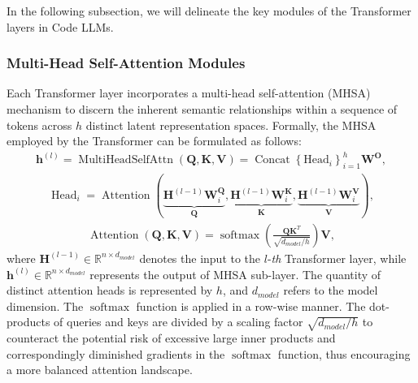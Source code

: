 In the following subsection, we will delineate the key modules of the Transformer layers in Code LLMs.

\subsubsection{Multi-Head Self-Attention Modules}
Each Transformer layer incorporates a multi-head self-attention (MHSA) mechanism to discern the inherent semantic relationships within a sequence of tokens across $h$ distinct latent representation spaces. 
Formally, the MHSA employed by the Transformer can be formulated as follows:
\begin{equation}\label{eq:multihead}
\begin{aligned}
    \mathbf{h}^{(l)}=\operatorname{MultiHeadSelfAttn}(\mathbf{Q},\mathbf{K},\mathbf{V}) =\operatorname{Concat}\left\{\mathrm{Head}_i\right\}_{i=1}^h\mathbf{W^O},
\end{aligned} 
\end{equation}
\begin{equation}
\begin{aligned}
    \operatorname{Head}_i =\operatorname{Attention}(\underbrace{\mathbf{H}^{(l-1)}\mathbf{W}_i^\mathbf{Q}}_{\mathbf{Q}},\underbrace{\mathbf{H}^{(l-1)}\mathbf{W}_i^\mathbf{K}}_{\mathbf{K}}, \underbrace{\mathbf{H}^{(l-1)}\mathbf{W}_i^\mathbf{V}}_\mathbf{V}), 
\end{aligned} 
\end{equation}
\begin{equation}\label{eq:attention}
\begin{aligned}
    \operatorname{Attention}(\mathbf{Q}, \mathbf{K}, \mathbf{V})=\operatorname{softmax}\left(\frac{\mathbf{Q}\mathbf{K}^T}{\sqrt{d_{model}/h}}\right)\mathbf{V},
\end{aligned}
\end{equation}
where $\mathbf{H}^{(l-1)} \in \mathbb{R}^{n\times d_{model}}$ denotes the input to the $l$-\textit{th} Transformer layer, while $\mathbf{h}^{(l)} \in \mathbb{R}^{n\times d_{model}}$ represents the output of MHSA sub-layer.  
The quantity of distinct attention heads is represented by $h$, and $d_{model}$ refers to the model dimension. 
The $\operatorname{softmax}$ function is applied in a row-wise manner. 
The dot-products of queries and keys are divided by a scaling factor $\sqrt{d_{model}/h}$ to counteract the potential risk of excessive large inner products and correspondingly diminished gradients in the $\operatorname{softmax}$ function, thus encouraging a more balanced attention landscape.

